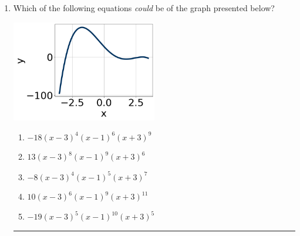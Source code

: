 \documentclass[14pt]{extbook}
\newcommand{\litem}[1]{\item#1\hspace*{-1cm}\rule{\textwidth}{0.4pt}}
\begin{document}
\begin{enumerate}
\litem{
Which of the following equations \textit{could} be of the graph presented below?
\begin{center}
    \includegraphics[width=0.5\textwidth]{../Figures/polyGraphToFunctionCopyC.png}
\end{center}
\begin{enumerate}[label=\Alph*.]
\item \( -18(x - 3)^{4} (x - 1)^{6} (x + 3)^{9} \)
\item \( 13(x - 3)^{8} (x - 1)^{9} (x + 3)^{6} \)
\item \( -8(x - 3)^{4} (x - 1)^{5} (x + 3)^{7} \)
\item \( 10(x - 3)^{6} (x - 1)^{9} (x + 3)^{11} \)
\item \( -19(x - 3)^{5} (x - 1)^{10} (x + 3)^{5} \)


\end{enumerate}}
\end{enumerate}
\end{document}
